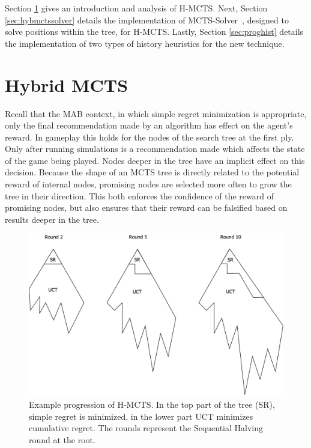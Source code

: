 \documentclass{kecsmstr}
\begin{document}
Section \ref{sec:hybmcts} gives an introduction and analysis of H-MCTS. Next, Section \ref{sec:hybmctssolver} details the implementation of MCTS-Solver~, designed to solve positions within the tree, for H-MCTS. Lastly, Section \ref{sec:proghist} details the implementation of two types of history heuristics for the new technique.
\newpage
\section{Hybrid MCTS}
\label{sec:hybmcts}

Recall that the MAB context, in which simple regret minimization is appropriate, only the final recommendation made by an algorithm has effect on the agent's reward. In gameplay this holds for the nodes of the search tree at the first ply. Only after running simulations is a recommendation made which affects the state of the game being played. Nodes deeper in the tree have an implicit effect on this decision. Because the shape of an MCTS tree is directly related to the potential reward of internal nodes, promising nodes are selected more often to grow the tree in their direction. This both enforces the confidence of the reward of promising nodes, but also ensures that their reward can be falsified based on results deeper in the tree.

\begin{figure}[ht]
	\centering
	\includegraphics[width=.8\textwidth]{img/H-MCTS.png}
	\caption{Example progression of H-MCTS. In the top part of the tree (SR), simple regret is minimized, in the lower part UCT minimizes cumulative regret. The rounds represent the Sequential Halving round at the root.}
	\label{fig:h-mcts_trees}
\end{figure}
\end{document}
